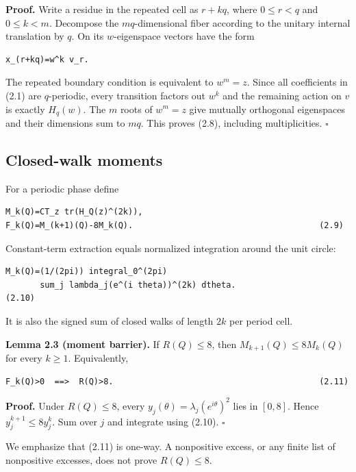 \textbf{Proof.} Write a residue in the repeated cell as \(r+kq\), where
\(0\le r<q\) and \(0\le k<m\). Decompose the \(mq\)-dimensional fiber according to the
unitary internal translation by \(q\). On its \(w\)-eigenspace vectors have the
form

\begin{lstlisting}[language={}]
x_(r+kq)=w^k v_r.
\end{lstlisting}

The repeated boundary condition is equivalent to \(w^m=z\). Since all
coefficients in (2.1) are \(q\)-periodic, every transition factors out \(w^k\)
and the remaining action on \(v\) is exactly \(H_q(w)\). The \(m\) roots of
\(w^m=z\) give mutually orthogonal eigenspaces and their dimensions sum to
\(mq\). This proves (2.8), including multiplicities. \(\square\)

\subsection{Closed-walk moments}

For a periodic phase define

\begin{lstlisting}[language={}]
M_k(Q)=CT_z tr(H_Q(z)^(2k)),
F_k(Q)=M_(k+1)(Q)-8M_k(Q).                                      (2.9)
\end{lstlisting}

Constant-term extraction equals normalized integration around the unit circle:

\begin{lstlisting}[language={}]
M_k(Q)=(1/(2pi)) integral_0^(2pi)
       sum_j lambda_j(e^(i theta))^(2k) dtheta.                  (2.10)
\end{lstlisting}

It is also the signed sum of closed walks of length \(2k\) per period cell.

\textbf{Lemma 2.3 (moment barrier).} If \(R(Q)\le 8\), then
\(M_{k+1}(Q)\le 8M_k(Q)\) for every \(k\ge 1\). Equivalently,

\begin{lstlisting}[language={}]
F_k(Q)>0  ==>  R(Q)>8.                                          (2.11)
\end{lstlisting}

\textbf{Proof.} Under \(R(Q)\le 8\), every
\(y_j(\theta)=\lambda_j(e^{i \theta})^2\) lies in \([0,8]\). Hence
\(y_j^{k+1}\le 8y_j^k\). Sum over \(j\) and integrate using (2.10). \(\square\)

We emphasize that (2.11) is one-way. A nonpositive excess, or any finite list
of nonpositive excesses, does not prove \(R(Q)\le 8\).

